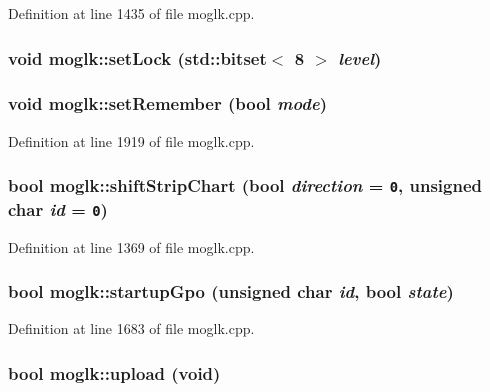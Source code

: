 Definition at line 1435 of file moglk.cpp.\hypertarget{classmoglk_a9d4351888605654a20b9d3e46160ce3}{
\subsubsection[{setLock}]{\setlength{\rightskip}{0pt plus 5cm}void moglk::setLock (std::bitset$<$ 8 $>$ {\em level})}}
\label{classmoglk_a9d4351888605654a20b9d3e46160ce3}


\hypertarget{classmoglk_a56976ce3e35fc312c11488a6c08cfdc}{
\subsubsection[{setRemember}]{\setlength{\rightskip}{0pt plus 5cm}void moglk::setRemember (bool {\em mode})}}
\label{classmoglk_a56976ce3e35fc312c11488a6c08cfdc}




Definition at line 1919 of file moglk.cpp.\hypertarget{classmoglk_0092806e3cf33100936dd48cc1bbe1ae}{
\subsubsection[{shiftStripChart}]{\setlength{\rightskip}{0pt plus 5cm}bool moglk::shiftStripChart (bool {\em direction} = {\tt 0}, \/  unsigned char {\em id} = {\tt 0})}}
\label{classmoglk_0092806e3cf33100936dd48cc1bbe1ae}




Definition at line 1369 of file moglk.cpp.\hypertarget{classmoglk_b5a54b14d6bb193873f2309474778849}{
\subsubsection[{startupGpo}]{\setlength{\rightskip}{0pt plus 5cm}bool moglk::startupGpo (unsigned char {\em id}, \/  bool {\em state})}}
\label{classmoglk_b5a54b14d6bb193873f2309474778849}




Definition at line 1683 of file moglk.cpp.\hypertarget{classmoglk_a133809f7d934231f03f1d59fbc88f75}{
\subsubsection[{upload}]{\setlength{\rightskip}{0pt plus 5cm}bool moglk::upload (void)}}
\label{classmoglk_a133809f7d934231f03f1d59fbc88f75}




